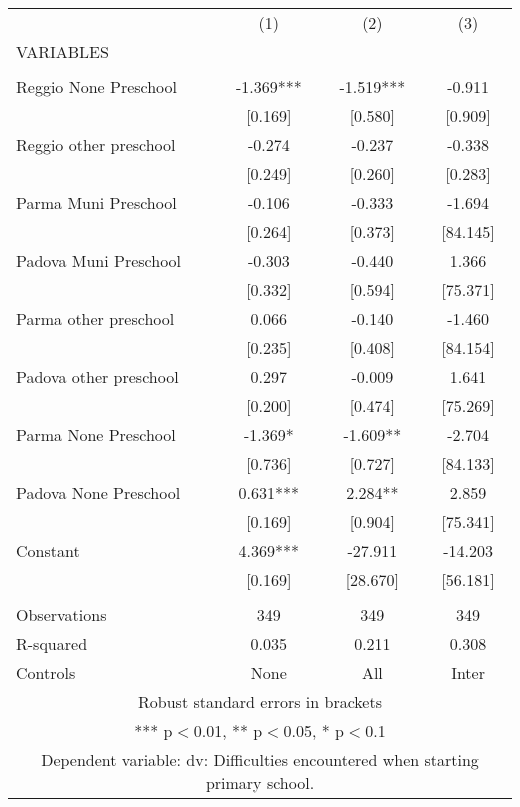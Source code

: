 \begin{tabular}{lccc} \hline
 & (1) & (2) & (3) \\
VARIABLES &  &  &  \\ \hline
 &  &  &  \\
Reggio None Preschool & -1.369*** & -1.519*** & -0.911 \\
 & [0.169] & [0.580] & [0.909] \\
Reggio other preschool & -0.274 & -0.237 & -0.338 \\
 & [0.249] & [0.260] & [0.283] \\
Parma Muni Preschool & -0.106 & -0.333 & -1.694 \\
 & [0.264] & [0.373] & [84.145] \\
Padova Muni Preschool & -0.303 & -0.440 & 1.366 \\
 & [0.332] & [0.594] & [75.371] \\
Parma other preschool & 0.066 & -0.140 & -1.460 \\
 & [0.235] & [0.408] & [84.154] \\
Padova other preschool & 0.297 & -0.009 & 1.641 \\
 & [0.200] & [0.474] & [75.269] \\
Parma None Preschool & -1.369* & -1.609** & -2.704 \\
 & [0.736] & [0.727] & [84.133] \\
Padova None Preschool & 0.631*** & 2.284** & 2.859 \\
 & [0.169] & [0.904] & [75.341] \\
Constant & 4.369*** & -27.911 & -14.203 \\
 & [0.169] & [28.670] & [56.181] \\
 &  &  &  \\
Observations & 349 & 349 & 349 \\
R-squared & 0.035 & 0.211 & 0.308 \\
 Controls & None & All & Inter \\ \hline
\multicolumn{4}{c}{ Robust standard errors in brackets} \\
\multicolumn{4}{c}{ *** p$<$0.01, ** p$<$0.05, * p$<$0.1} \\
\multicolumn{4}{c}{ Dependent variable: dv: Difficulties encountered when starting primary school.} \\
\end{tabular}
